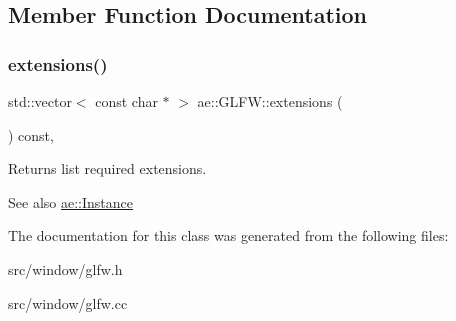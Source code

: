 \subsection{Member Function Documentation}
\hypertarget{classae_1_1_g_l_f_w_a5ec4f5b56e7f9a2011aaa4716503c563}{}\label{classae_1_1_g_l_f_w_a5ec4f5b56e7f9a2011aaa4716503c563} 
\subsubsection{\texorpdfstring{extensions()}{extensions()}}
{\footnotesize\ttfamily std\+::vector$<$ const char $\ast$ $>$ ae\+::\+G\+L\+F\+W\+::extensions (\begin{DoxyParamCaption}{ }\end{DoxyParamCaption}) const\hspace{0.3cm}{\ttfamily [override]}, {\ttfamily [noexcept]}}

Returns list required extensions.

\begin{DoxySeeAlso}{See also}
\hyperlink{classae_1_1_instance}{ae\+::\+Instance} 
\end{DoxySeeAlso}


The documentation for this class was generated from the following files\+:\begin{DoxyCompactItemize}
\item 
src/window/glfw.\+h\item 
src/window/glfw.\+cc\end{DoxyCompactItemize}
